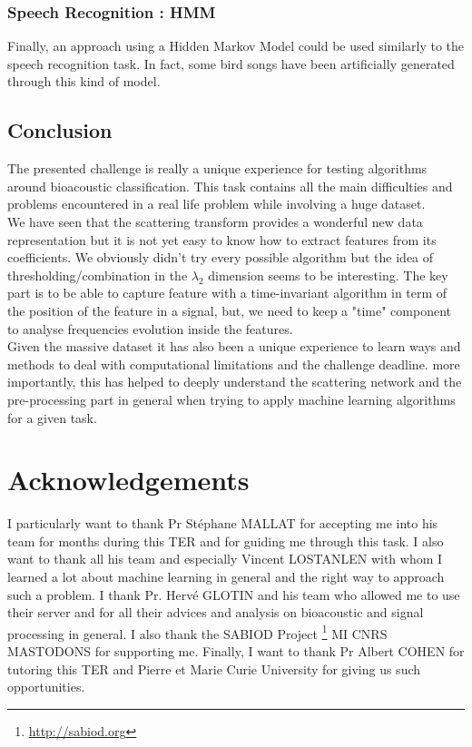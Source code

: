 \documentclass[a4paper]{report}
\begin{document}
\subsection{Speech Recognition : HMM}
Finally, an approach using a Hidden Markov Model could be used similarly to the speech recognition task. In fact, some bird songs have been artificially generated through this kind of model. 
\section{Conclusion}


The presented challenge is really a unique experience for testing algorithms around bioacoustic classification. This task contains all the main difficulties and problems encountered in a real life problem while involving a huge dataset. 
\\
We have seen that the scattering transform provides a wonderful new data representation but it is not yet easy to know how to extract features from its coefficients. We obviously didn't try every possible algorithm but the idea of thresholding/combination in the $\lambda_2$ dimension seems to be interesting. The key part is to be able to capture feature with a time-invariant algorithm in term of the position of the feature in a signal, but, we need to keep a "time" component to analyse frequencies evolution inside the features.
\\

Given the massive dataset it has also been a unique experience to learn ways and methods to deal with computational limitations and the challenge deadline.
more importantly, this has helped to deeply understand the scattering network and the pre-processing part in general when trying to apply machine learning algorithms for a given task.


\chapter*{Acknowledgements}
I particularly want to thank Pr St\'ephane MALLAT for accepting me into his team for months during this TER and for guiding me through this task. I also want to thank all his team and especially Vincent LOSTANLEN with whom I learned a lot about machine learning in general and the right way to approach such a problem. 
I thank Pr. Herv\'e GLOTIN and his team who  allowed me to use their server and for all their advices and analysis on bioacoustic and signal processing in general.
I also thank the SABIOD Project \footnote{\url{http://sabiod.org}}
MI CNRS MASTODONS for supporting me.
Finally, I want to thank Pr Albert COHEN for tutoring this TER and Pierre et Marie Curie University for giving us such opportunities.



\nocite{*}
\end{document}
